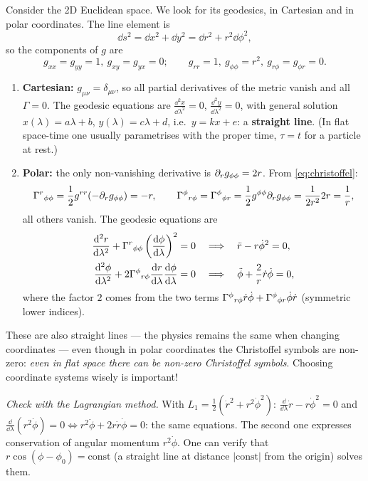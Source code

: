 Consider the 2D Euclidean space. We look for its geodesics, in Cartesian and in polar coordinates. The line element is
\[
  \dd s^2=\dd x^2+\dd y^2=\dd r^2+r^2\dd\phi^2,
\]
so the components of $g$ are
\[
  g_{xx}=g_{yy}=1,\ g_{xy}=g_{yx}=0;\qquad g_{rr}=1,\ g_{\phi\phi}=r^2,\ g_{r\phi}=g_{\phi r}=0 .
\]
\begin{enumerate}[label=(\roman*)]
\item \textbf{Cartesian:} $g_{\mu\nu}=\delta_{\mu\nu}$, so all partial derivatives of the metric vanish and all $\Gamma=0$. The geodesic equations are $\frac{\dd^2x}{\dd\lambda^2}=0$, $\frac{\dd^2y}{\dd\lambda^2}=0$, with general solution $x(\lambda)=a\lambda+b$, $y(\lambda)=c\lambda+d$, i.e.\ $y=kx+e$: a \textbf{straight line}. (In flat space-time one usually parametrises with the proper time, $\tau=t$ for a particle at rest.)
\item \textbf{Polar:} the only non-vanishing derivative is $\partial_r g_{\phi\phi}=2r$. From \eqref{eq:christoffel}:
\[
  \Gamma^{r}{}_{\phi\phi}=\frac12 g^{rr}(-\partial_r g_{\phi\phi})=-r,\qquad
  \Gamma^{\phi}{}_{r\phi}=\Gamma^{\phi}{}_{\phi r}=\frac12 g^{\phi\phi}\partial_r g_{\phi\phi}=\frac{1}{2r^2}2r=\frac1r ,
\]
all others vanish. The geodesic equations are
\begin{align}
  \frac{\mathrm{d}^2r}{\mathrm{d}\lambda^2}+\Gamma^{r}{}_{\phi\phi}\left(\frac{\mathrm{d}\phi}{\mathrm{d}\lambda}\right)^2=0&\quad\Longrightarrow\quad\ddot r-r\dot\phi^2=0,\\
  \frac{\mathrm{d}^2\phi}{\mathrm{d}\lambda^2}+2\Gamma^{\phi}{}_{r\phi}\frac{\mathrm{d} r}{\mathrm{d}\lambda}\frac{\mathrm{d}\phi}{\mathrm{d}\lambda}=0&\quad\Longrightarrow\quad\ddot\phi+\frac2r\dot r\dot\phi=0,
\end{align}
where the factor $2$ comes from the two terms $\Gamma^{\phi}{}_{r\phi}\dot r\dot\phi+\Gamma^{\phi}{}_{\phi r}\dot\phi\dot r$ (symmetric lower indices).
\end{enumerate}
These are also straight lines --- the physics remains the same when changing coordinates --- even though in polar coordinates the Christoffel symbols are non-zero: \emph{even in flat space there can be non-zero Christoffel symbols}. Choosing coordinate systems wisely is important!

\textit{Check with the Lagrangian method.} With $L_1=\frac12(\dot r^2+r^2\dot\phi^2)$: $\frac{\dd}{\dd\lambda}\dot r-r\dot\phi^2=0$ and $\frac{\dd}{\dd\lambda}(r^2\dot\phi)=0\Leftrightarrow r^2\ddot\phi+2r\dot r\dot\phi=0$: the same equations. The second one expresses conservation of angular momentum $r^2\dot\phi$. One can verify that $r\cos(\phi-\phi_0)=\text{const}$ (a straight line at distance $|\text{const}|$ from the origin) solves them.
